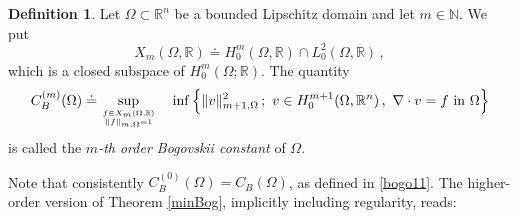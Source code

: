 \documentclass[11pt]{article}
\theoremstyle{plain}
\theoremstyle{definition}
\newtheorem{definition}[theorem]{Definition}
\numberwithin{equation}{section}
\newcommand{\R}{\mathbb{R}}
\newcommand{\N}{\mathbb{N}}
\begin{document}
\begin{definition} \label{defboghigher}
Let $\Omega\subset\R^n$ be a bounded Lipschitz domain and let $m\in\N$. We put
	$$
	X_{m}(\Omega, \mathbb{R}) \doteq H_{0}^{m}(\Omega, \mathbb{R}) \cap L_{0}^{2}(\Omega, \mathbb{R}) \, ,
	$$
which is a closed subspace of $H_{0}^{m}(\Omega; \mathbb{R})$. The quantity
	\begin{equation}\label{bogok}
		C_{B}^{(m)}(\Omega) \doteq   \sup_ {f\in X_{m}(\Omega, \mathbb{R}) \atop \|f\|_{m,\Omega}=1}\quad\inf\Big\{\|v\|_{m+1,\Omega}^2\, ;
		\ v\in H^{m+1}_0(\Omega, \mathbb{R}^{n})\, ,\ \nabla\cdot v=f \text{ in } \Omega\Big\}
	\end{equation}
	is called the {\em $m$-th order Bogovskii constant} of $\Omega$. 
\end{definition}

Note that consistently $C_{B}^{(0)}(\Omega)=C_B(\Omega)$, as defined in \eqref{bogo11}.
The higher-order version of Theorem \ref{minBog}, implicitly including regularity, reads:
\end{document}
